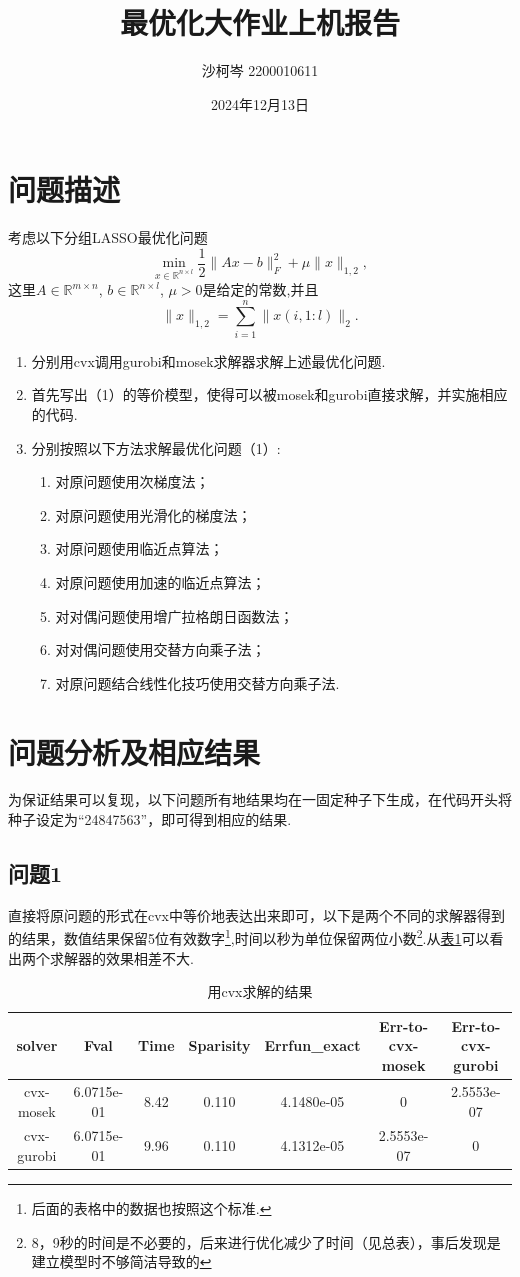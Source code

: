\documentclass[10pt,a4paper]{article}
\title{最优化大作业上机报告}
\author{沙柯岑 2200010611}
\date{2024年12月13日}
\begin{document}
	\maketitle
	\tableofcontents
	\newpage
\section{问题描述}
\indent 考虑以下分组LASSO最优化问题
\begin{equation}
	\min_{x\in \mathbb{R}^{n\times l}}\frac{1}{2}\|Ax-b\|_{F}^{2}+\mu\|x\|_{1,2},
\end{equation}
这里$A\in \mathbb{R}^{m\times n}$, $b\in \mathbb{R}^{n\times l}$, $\mu>0$是给定的常数,并且
$$\|x\|_{1,2}=\sum\limits_{i=1}^{n}\|x(i,1:l)\|_{2}.$$
\begin{enumerate}
	\item 分别用cvx调用gurobi和mosek求解器求解上述最优化问题.
	\item 首先写出（1）的等价模型，使得可以被mosek和gurobi直接求解，并实施相应的代码.
	\item 分别按照以下方法求解最优化问题（1）:
	\begin{enumerate}
		\item 对原问题使用次梯度法；
		\item 对原问题使用光滑化的梯度法；
		\item 对原问题使用临近点算法；
		\item 对原问题使用加速的临近点算法；
		\item 对对偶问题使用增广拉格朗日函数法；
		\item 对对偶问题使用交替方向乘子法；
		\item 对原问题结合线性化技巧使用交替方向乘子法.
	\end{enumerate}
\end{enumerate}
\section{问题分析及相应结果}
\indent 为保证结果可以复现，以下问题所有地结果均在一固定种子下生成，在代码开头将种子设定为“24847563”，即可得到相应的结果.
\subsection{问题1}
\indent 直接将原问题的形式在cvx中等价地表达出来即可，以下是两个不同的求解器得到的结果，数值结果保留5位有效数字\footnote{后面的表格中的数据也按照这个标准.},时间以秒为单位保留两位小数\footnote{8，9秒的时间是不必要的，后来进行优化减少了时间（见总表），事后发现是建立模型时不够简洁导致的}.从\hyperref[2]{表1}可以看出两个求解器的效果相差不大.
\begin{table}[h]
	\centering
	\begin{tabular}{|c|c|c|c|c|c|c|}
		\hline
		solver& Fval  &Time&Sparisity& Errfun\_exact &Err-to-cvx-mosek&Err-to-cvx-gurobi\\
		\hline
		cvx-mosek&6.0715e-01&8.42&0.110&4.1480e-05&0&2.5553e-07\\
		\hline
		cvx-gurobi&6.0715e-01&9.96&0.110&4.1312e-05&2.5553e-07&0\\
		\hline
	\end{tabular}
	\caption{用cvx求解的结果}
	\label{2}
\end{table}
\end{document}

